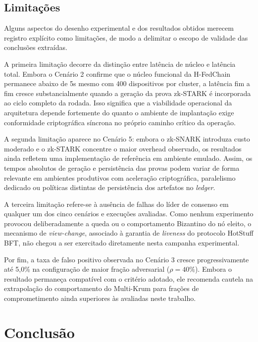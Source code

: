 \documentclass[12pt]{article}
\begin{document}
\subsection{Limitações}

Alguns aspectos do desenho experimental e dos resultados obtidos merecem registro explícito como limitações, de modo a delimitar o escopo de validade das conclusões extraídas.

A primeira limitação decorre da distinção entre latência de núcleo e latência total. Embora o Cenário 2 confirme que o núcleo funcional da H-FedChain permanece abaixo de 5s mesmo com 400 dispositivos por cluster, a latência fim a fim cresce substancialmente quando a geração da prova zk-STARK é incorporada ao ciclo completo da rodada. Isso significa que a viabilidade operacional da arquitetura depende fortemente do quanto o ambiente de implantação exige conformidade criptográfica síncrona no próprio caminho crítico da operação.

A segunda limitação aparece no Cenário 5: embora o zk-SNARK introduza custo moderado e o zk-STARK concentre o maior overhead observado, os resultados ainda refletem uma implementação de referência em ambiente emulado. Assim, os tempos absolutos de geração e persistência das provas podem variar de forma relevante em ambientes produtivos com aceleração criptográfica, paralelismo dedicado ou políticas distintas de persistência dos artefatos no \textit{ledger}.

A terceira limitação refere-se à ausência de falhas do líder de consenso em qualquer um dos cinco cenários e execuções avaliadas. Como nenhum experimento provocou deliberadamente a queda ou o comportamento Bizantino do nó eleito, o mecanismo de \textit{view-change}, associado à garantia de \textit{liveness} do protocolo HotStuff BFT, não chegou a ser exercitado diretamente nesta campanha experimental.

Por fim, a taxa de falso positivo observada no Cenário 3 cresce progressivamente até 5,0\% na configuração de maior fração adversarial ($\rho=40\%$). Embora o resultado permaneça compatível com o critério adotado, ele recomenda cautela na extrapolação do comportamento do Multi-Krum para frações de comprometimento ainda superiores às avaliadas neste trabalho.

\section{Conclusão}
\end{document}
